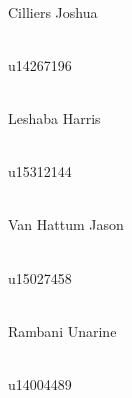 \documentclass[english]{article}
\begin{document}
	\begin{minipage}{0.4\textwidth}
		\begin{flushleft} \large
			\emph{} \\
			Cilliers {Joshua}
		\end{flushleft}
	\end{minipage}
	\begin{minipage}{0.4\textwidth}
		\begin{flushright} \large
			\emph{} \\
			u14267196
		\end{flushright}
	\end{minipage}

	\begin{minipage}{0.4\textwidth}
		\begin{flushleft} \large
			\emph{} \\
			Leshaba {Harris}
		\end{flushleft}
	\end{minipage}
	\begin{minipage}{0.4\textwidth}
		\begin{flushright} \large
			\emph{} \\
			u15312144
		\end{flushright}
	\end{minipage}

	\begin{minipage}{0.4\textwidth}
		\begin{flushleft} \large
			\emph{} \\
			Van Hattum {Jason}
		\end{flushleft}
	\end{minipage}
	\begin{minipage}{0.4\textwidth}
		\begin{flushright} \large
			\emph{} \\
			u15027458
		\end{flushright}
	\end{minipage}


	\begin{minipage}{0.4\textwidth}
		\begin{flushleft} \large
			\emph{} \\
			Rambani {Unarine}
		\end{flushleft}
	\end{minipage}
	\begin{minipage}{0.4\textwidth}
		\begin{flushright} \large
			\emph{} \\
			u14004489
		\end{flushright}
	\end{minipage}
	\newpage
\end{document}

